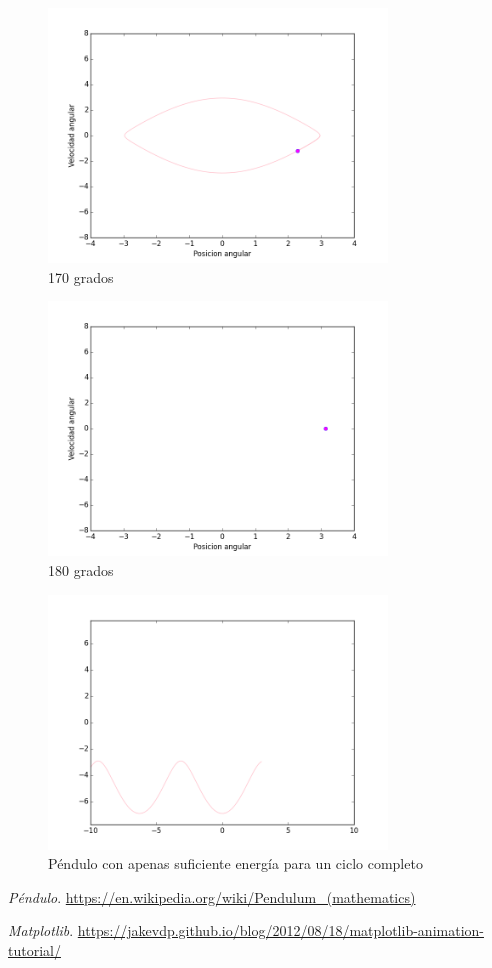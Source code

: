 \documentclass[12pt]{article}
\begin{document}
\begin{figure}[H]
		\centering
	\includegraphics[width=9cm]{170f.png}
	\caption{170 grados}
\end{figure}

\begin{figure}[H]
		\centering
	\includegraphics[width=9cm]{180f.png}
	\caption{180 grados}
\end{figure}

\begin{figure}[H]
		\centering
	\includegraphics[width=9cm]{jf.png}
	\caption{Péndulo con apenas suficiente energía para un ciclo completo}
\end{figure}







\begin{thebibliography}{6}
	
	\emph{Péndulo}. 
	\url{https://en.wikipedia.org/wiki/Pendulum_(mathematics)}
	
	\emph{Matplotlib}. 
	\url{https://jakevdp.github.io/blog/2012/08/18/matplotlib-animation-tutorial/}
	
\end{thebibliography}
\end{document}
